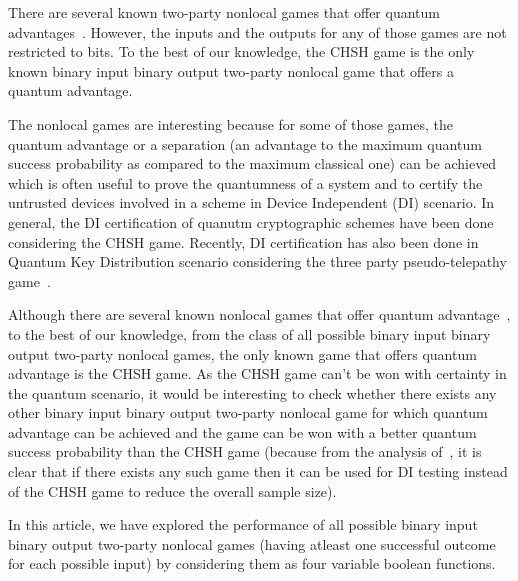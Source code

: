 \documentclass[]{svjour3}
\begin{document}
There are several known two-party nonlocal games that offer quantum advantages~\cite{BBT05,CM14}. However, the inputs and the outputs for any of those games are not restricted to bits. To the best of our knowledge, the CHSH game is the only known binary input binary output two-party nonlocal game that offers a quantum advantage.

The nonlocal games are interesting because for some of those games, the quantum advantage or a separation (an advantage to the maximum quantum success probability as compared to the maximum classical one) can be achieved which is often useful to prove the quantumness of a system and to certify the untrusted devices involved in a scheme in Device Independent (DI) scenario. In general, the DI certification of quanutm cryptographic schemes have been done~\cite{BCMM22,MPR17,VV14} considering the CHSH game. Recently, DI certification has also been done in Quantum Key Distribution scenario considering the three party pseudo-telepathy game~\cite{BMM19}.    




Although there are several known nonlocal games that offer quantum advantage~\cite{BBT05,BBT03}, to the best of our knowledge, from the class of all possible binary input binary output two-party nonlocal games, the only known game that offers quantum advantage is the CHSH game. As the CHSH game can't be won with certainty in the quantum scenario, it would be interesting to check whether there exists any other binary input binary output two-party nonlocal game for which quantum advantage can be achieved and the game can be won with a better quantum success probability than the CHSH game (because from the analysis of~\cite{JS18}, it is clear that if there exists any such game then it can be used for DI testing instead of the CHSH game to reduce the overall sample size).  

In this article, we have explored the performance of
all possible binary input binary output two-party nonlocal games
(having atleast one successful outcome for each possible input)
by considering them as four variable boolean functions.
\end{document}
